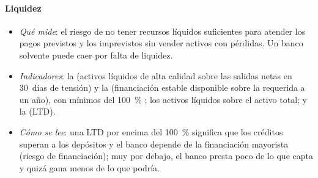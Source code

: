 \documentclass[11pt]{article}
\begin{document}
\paragraph{Liquidez}
\begin{itemize}
\item \emph{Qué mide}: el riesgo de no tener recursos líquidos suficientes para atender los pagos previstos y los imprevistos sin vender activos con pérdidas. Un banco solvente puede caer por falta de liquidez.
\item \emph{Indicadores}: la  (activos líquidos de alta calidad sobre las salidas netas en 30~días de tensión) y la  (financiación estable disponible sobre la requerida a un año), con mínimos del 100~\% \parencite{BCBS2013LCR,BCBS2014NSFR}; los activos líquidos sobre el activo total; y la  (LTD).
\item \emph{Cómo se lee}: una LTD por encima del 100~\% significa que los créditos superan a los depósitos y el banco depende de la financiación mayorista (riesgo de financiación); muy por debajo, el banco presta poco de lo que capta y quizá gana menos de lo que podría.
\end{itemize}
\end{document}
